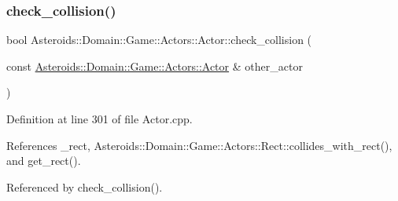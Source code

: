 \subsubsection{\texorpdfstring{check\+\_\+collision()}{check\_collision()}\hspace{0.1cm}{\footnotesize\ttfamily [1/2]}}
{\footnotesize\ttfamily bool Asteroids\+::\+Domain\+::\+Game\+::\+Actors\+::\+Actor\+::check\+\_\+collision (\begin{DoxyParamCaption}\item[{const \hyperlink{classAsteroids_1_1Domain_1_1Game_1_1Actors_1_1Actor}{Asteroids\+::\+Domain\+::\+Game\+::\+Actors\+::\+Actor} \&}]{other\+\_\+actor }\end{DoxyParamCaption})}



Definition at line 301 of file Actor.\+cpp.



References \+\_\+rect, Asteroids\+::\+Domain\+::\+Game\+::\+Actors\+::\+Rect\+::collides\+\_\+with\+\_\+rect(), and get\+\_\+rect().



Referenced by check\+\_\+collision().

